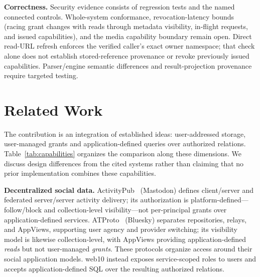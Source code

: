 \documentclass[sigconf, nonacm]{acmart}
\begin{document}
\textbf{Correctness.} Security evidence consists of regression tests and the
named connected controls. Whole-system conformance, revocation-latency bounds
(racing grant changes with reads through metadata visibility, in-flight
requests, and issued capabilities), and the media capability boundary remain
open. Direct read-URL refresh enforces the verified caller's exact owner
namespace; that check alone does not establish stored-reference provenance or
revoke previously issued capabilities. Parser/engine semantic differences and result-projection provenance
require targeted testing.

\section{Related Work}
\label{sec:related}

The contribution is an integration of established ideas: user-addressed
storage, user-managed grants and application-defined queries over authorized
relations. Table~\ref{tab:capabilities} organizes the comparison along these
dimensions. We discuss design differences from the cited systems rather than
claiming that no prior implementation combines these capabilities.

\textbf{Decentralized social data.}
ActivityPub~\cite{activitypub2018} (Mastodon) defines client/server and
federated server/server activity delivery; its authorization is
platform-defined---follow/block and collection-level visibility---not
per-principal grants over application-defined services. ATProto~\cite{kleppmann2024}
(Bluesky) separates repositories, relays, and AppViews, supporting user agency
and provider switching; its visibility model is likewise collection-level, with
AppViews providing application-defined \emph{reads} but not user-managed
\emph{grants}. These protocols organize access around their social application
models. web10 instead exposes service-scoped roles to users and accepts
application-defined SQL over the resulting authorized relations.
\end{document}
